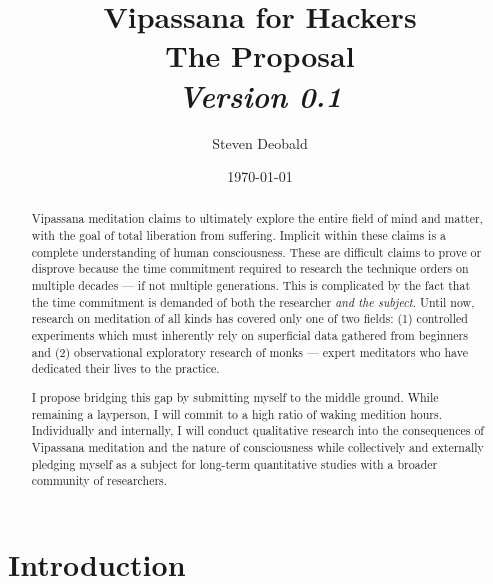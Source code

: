 \documentclass[a4paper, amsfonts, amssymb, amsmath, reprint, showkeys, nofootinbib, twoside]{revtex4-1}
\begin{document}
\title{%
  \large{Vipassana for Hackers} \\
  \Huge{The Proposal} \\
  \large\textit{Version 0.1}
}
\author{Steven Deobald}
\date{\today}

\begin{abstract}
Vipassana meditation claims to ultimately explore the entire field of
mind and matter, with the goal of total liberation from suffering. Implicit
within these claims is a complete understanding of human consciousness. These are
difficult claims to prove or disprove because the time commitment required to research the
technique orders on multiple decades --- if not multiple generations.
This is complicated by the
fact that the time commitment is demanded of both the researcher \textit{and the
subject}. Until now, research on meditation of all kinds has covered only one of
two fields:
(1) controlled experiments which must inherently rely on superficial data
gathered from beginners \cite{https://doi.org/10.1002/jclp.20761,
  https://doi.org/10.1037/a0018441,
  https://doi.org/10.1093/scan/nss054,
  https://doi.org/10.31231/osf.io/hzv65}
and (2) observational exploratory research of monks --- expert
meditators who have dedicated their lives to the practice.
\cite{https://doi.org/10.1073/pnas.0407401101,
https://doi.org/10.1371/journal.pone.0073417}

I propose bridging this
gap by submitting myself to the middle ground. While remaining a layperson, I will
commit to a high ratio of waking medition hours. Individually
and internally, I will conduct qualitative research into the consequences of
Vipassana meditation and the nature of consciousness while collectively and
externally pledging myself as a subject for long-term quantitative
studies with a broader community of researchers.

\end{abstract}


\maketitle

\listoftodos

\section{Introduction}
\end{document}

